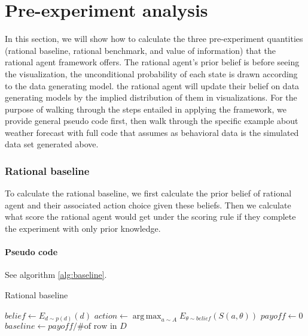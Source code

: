 \documentclass{article}
\DeclareMathOperator*{\argmax}{arg\,max}
\begin{document}
\section{Pre-experiment analysis}

In this section, we will show how to calculate the three pre-experiment quantities (rational baseline, rational benchmark, and value of information) that the rational agent framework offers. The rational agent's prior belief is before seeing the visualization, the unconditional probability of each state is drawn according to the data generating model. the rational agent will update their belief on data generating models by the implied distribution of them in visualizations. For the purpose of walking through the steps entailed in applying the framework, we provide general pseudo code first, then walk through the specific example about weather forecast with full code that assumes as behavioral data is the simulated data set generated above.

\subsubsection{Rational baseline}

To calculate the rational baseline, we first calculate the prior belief of rational agent and their associated action choice given these beliefs. Then we calculate what score the rational agent would get under the scoring rule if they complete the experiment with only prior knowledge.

\paragraph{Pseudo code} 
See algorithm \ref{alg:baseline}.

\begin{algorithm}[!h]
\caption{Rational baseline}\label{alg:baseline}
$belief \gets E_{d\sim p(d)}(d)$\;
$action \gets \argmax_{a \sim A}{E_{\theta \sim belief}(S(a, \theta))}$\;
$payoff \gets 0$\;
$baseline \gets payoff / \text{\# of row in }D$\;
\end{algorithm}
\end{document}
